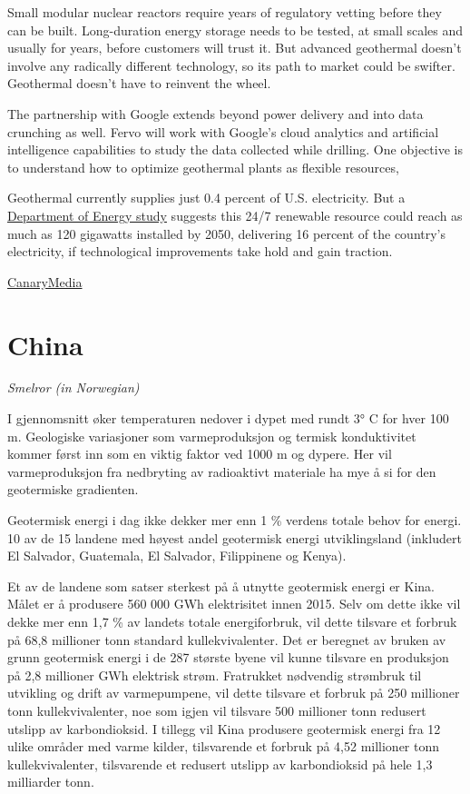 \documentclass[
]{book}
\begin{document}
Small modular nuclear reactors require years of regulatory vetting before they can be built. Long-duration energy storage needs to be tested, at small scales and usually for years, before customers will trust it. But advanced geothermal doesn't involve any radically different technology, so its path to market could be swifter.
Geothermal doesn't have to reinvent the wheel.

The partnership with Google extends beyond power delivery and into data crunching as well. Fervo will work with Google's cloud analytics and artificial intelligence capabilities to study the data collected while drilling. One objective is to understand how to optimize geothermal plants as flexible resources,

Geothermal currently supplies just 0.4 percent of U.S. electricity.
But a \href{https://www.energy.gov/sites/default/files/2019/06/f63/GeoVision-full-report-opt.pdf}{Department of Energy study} suggests this 24/7 renewable resource could reach as much as 120 gigawatts installed by 2050, delivering 16 percent of the country's electricity, if technological improvements take hold and gain traction.

\href{https://www.canarymedia.com/articles/google-taps-geothermal-for-corporate-clean-energy/}{CanaryMedia}

\hypertarget{china}{%
\section{China}\label{china}}

\emph{Smelror (in Norwegian)}

I gjennomsnitt øker temperaturen nedover i dypet med rundt 3° C for hver 100 m.
Geologiske variasjoner som varmeproduksjon og termisk konduktivitet kommer først inn som en viktig faktor ved 1000 m og dypere. Her vil varmeproduksjon fra nedbryting av radioaktivt materiale ha mye å si for den geotermiske gradienten.

Geotermisk energi i dag ikke dekker mer enn 1 \% verdens totale behov for energi.
10 av de 15 landene med høyest andel geotermisk energi utviklingsland (inkludert El Salvador, Guatemala, El Salvador, Filippinene og Kenya).

Et av de landene som satser sterkest på å utnytte geotermisk energi er Kina. Målet er å produsere 560 000 GWh elektrisitet innen 2015. Selv om dette ikke vil dekke mer enn 1,7 \% av landets totale energiforbruk, vil dette tilsvare et forbruk på 68,8 millioner tonn standard kullekvivalenter. Det er beregnet av bruken av grunn geotermisk energi i de 287 største byene vil kunne tilsvare en produksjon på 2,8 millioner GWh elektrisk strøm. Fratrukket nødvendig strømbruk til utvikling og drift av varmepumpene, vil dette tilsvare et forbruk på 250 millioner tonn kullekvivalenter, noe som igjen vil tilsvare 500 millioner tonn redusert utslipp av karbondioksid. I tillegg vil Kina produsere geotermisk energi fra 12 ulike områder med varme kilder, tilsvarende et forbruk på 4,52 millioner tonn kullekvivalenter, tilsvarende et redusert utslipp av karbondioksid på hele 1,3 milliarder tonn.
\end{document}
